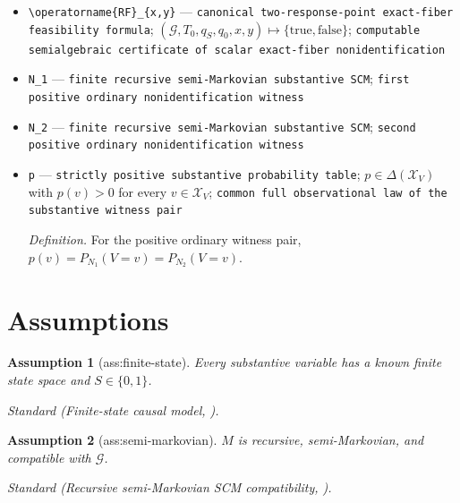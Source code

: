\documentclass{article}
\newtheorem{assumption}{Assumption}
\begin{document}
\begin{itemize}
  \par\smallskip\noindent\emph{Definition.} \(\rho_{\vartheta}=\sum_{v\in\mathcal X_V}p_{\vartheta}(v,1)\).
  \item \texttt{\textbackslash{}\allowbreak{}operatorname\{RF\}\allowbreak{}\_\allowbreak{}\{x,\allowbreak{}y\}\allowbreak{}} --- \texttt{canonical two-\allowbreak{}response-\allowbreak{}point exact-\allowbreak{}fiber feasibility formula}; \((\mathcal G,T_0,q_S,q_0,x,y)\mapsto\{\mathrm{true},\mathrm{false}\}\); \texttt{computable semialgebraic certificate of scalar exact-\allowbreak{}fiber nonidentification}
  \item \texttt{N\_\allowbreak{}1} --- \texttt{finite recursive semi-\allowbreak{}Markovian substantive SCM}; \texttt{first positive ordinary nonidentification witness}
  \item \texttt{N\_\allowbreak{}2} --- \texttt{finite recursive semi-\allowbreak{}Markovian substantive SCM}; \texttt{second positive ordinary nonidentification witness}
  \item \texttt{p} --- \texttt{strictly positive substantive probability table}; \(p\in\Delta(\mathcal X_V)\) with \(p(v)>0\) for every \(v\in\mathcal X_V\); \texttt{common full observational law of the substantive witness pair}
  \par\smallskip\noindent\emph{Definition.} For the positive ordinary witness pair, \(p(v)=P_{N_1}(V=v)=P_{N_2}(V=v)\).
\end{itemize}

\section{Assumptions}

\begin{assumption}[ass:finite-state]\label{ass:finite-state}
Every substantive variable has a known finite state space and \(S\in\{0,1\}\).
\par\smallskip\noindent\emph{Standard} (Finite-state causal model, \cite{ShpitserPearl2006JointID}).
\end{assumption}

\begin{assumption}[ass:semi-markovian]\label{ass:semi-markovian}
\(M\) is recursive, semi-Markovian, and compatible with \(\mathcal G\).
\par\smallskip\noindent\emph{Standard} (Recursive semi-Markovian SCM compatibility, \cite{ShpitserPearl2006JointID}).
\end{assumption}
\end{document}
